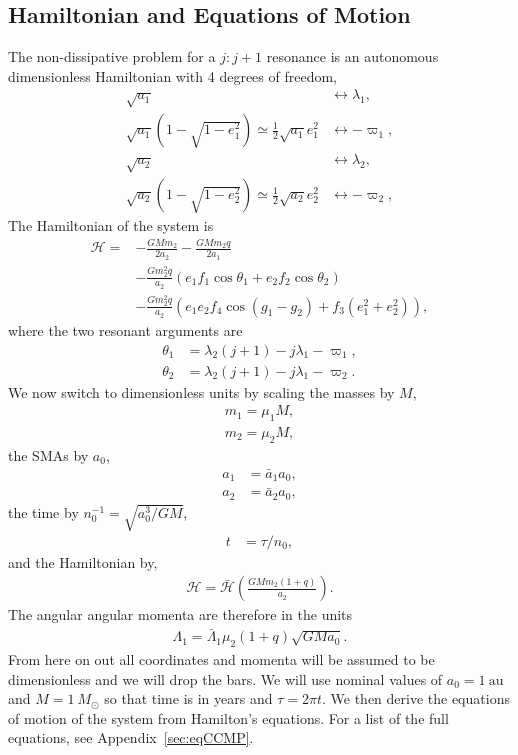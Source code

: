 \documentclass[usenatbib,twocolumn]{mnras}
\begin{document}
\subsection{Hamiltonian and Equations of Motion}
The non-dissipative problem for a $j:j+1$ resonance is an autonomous dimensionless Hamiltonian with 4 degrees of freedom,
\begin{align}
    \sqrt{a_1}&\leftrightarrow \lambda_1,\\
    \sqrt{a_1}(1-\sqrt{1-e_1^2})\simeq\frac12\sqrt{a_1}e_1^2&\leftrightarrow -\varpi_1,\\
    \sqrt{a_2}&\leftrightarrow \lambda_2,\\
    \sqrt{a_2}(1-\sqrt{1-e_2^2})\simeq\frac12\sqrt{a_2}e_2^2&\leftrightarrow -\varpi_2,
\end{align}
The Hamiltonian of the system is
\begin{align}
    \label{eq:CCMP_H}
    \mathcal H=
    &- \frac{G M m_{2}}{2 a_{2}} - \frac{G M m_{2} q}{2 a_{1}} \\
    &- \frac{G m_{2}^{2} q}{a_{2}} \left(e_{1} f_{1} \cos{\theta_1} + e_{2} f_{2} \cos{\theta_2}\right) \\
    &- \frac{G m_{2}^{2} q}{a_{2}} \left(e_{1} e_{2} f_{4} \cos{\left(g_{1} - g_{2} \right)} + f_{3} \left(e_{1}^{2} + e_{2}^{2}\right)\right),
\end{align}
where the two resonant arguments are
\begin{align}
    \theta_1 &=\lambda_{2} \left(j + 1\right) - j \lambda_{1}-\varpi_{1}, \\
    \theta_2 &= \lambda_{2} \left(j + 1\right)- j \lambda_{1}-\varpi_{2}.
\end{align}
We now switch to dimensionless units by scaling the masses by $M$,
\begin{align}
    m_1 = \mu_1 M,\\
    m_2 = \mu_2 M,
\end{align}
the SMAs by $a_0$,
\begin{align}
    a_1 &= \bar a_1a_0,\\
    a_2 &= \bar a_2a_0,
\end{align}
the time by $n_0^{-1} = \sqrt{a_0^{3}/GM}$,
\begin{align}
    t &= \tau/n_0,
\end{align}
and the Hamiltonian by,
\begin{align}
    \mathcal H = \bar{\mathcal{H}} \left(\frac{GMm_2(1+q)}{a_2}\right).
\end{align}
The angular angular momenta are therefore in the units
\begin{align}
    \Lambda_1 = \bar\Lambda_1 \mu_2(1+q)\sqrt{GMa_{0}}.
\end{align}
From here on out all coordinates and momenta will be assumed to be dimensionless and we will drop the bars.
We will use nominal values of $a_0=1~\mathrm{au}$ and $M=1~M_\odot$ so that time is in years and $\tau=2\pi t$.
We then derive the equations of motion of the system from Hamilton's equations. For a list of the full equations, see Appendix~\ref{sec:eqCCMP}.
\end{document}
